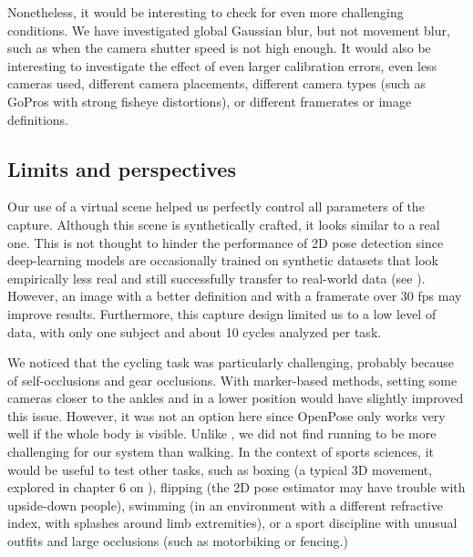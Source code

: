 Nonetheless, it would be interesting to check for even more challenging conditions. We have investigated global Gaussian blur, but not movement blur, such as when the camera shutter speed is not high enough. It would also be interesting to investigate the effect of even larger calibration errors, even less cameras used, different camera placements, different camera types (such as GoPros with strong fisheye distortions), or different framerates or image definitions.


\subsection{Limits and perspectives}

Our use of a virtual scene helped us perfectly control all parameters of the capture. Although this scene is synthetically crafted, it looks similar to a real one. This is not thought to hinder the performance of 2D pose detection since deep-learning models are occasionally trained on synthetic datasets that look empirically less real and still successfully transfer to real-world data (see \cite{Patel2021,Wood2021,Bolanos2021,Varol2017}). However, an image with a better definition and with a framerate over 30 fps may improve results. Furthermore, this capture design limited us to a low level of data, with only one subject and about 10 cycles analyzed per task.

We noticed that the cycling task was particularly challenging, probably because of self-occlusions and gear occlusions. With marker-based methods, setting some cameras closer to the ankles and in a lower position would have slightly improved this issue. However, it was not an option here since OpenPose only works very well if the whole body is visible. Unlike \cite{D'Antonio2021}, we did not find running to be more challenging for our system than walking. In the context of sports sciences, it would be useful to test other tasks, such as boxing (a typical 3D movement, explored in chapter 6 on  \cite{Pagnon2022c}), flipping (the 2D pose estimator may have trouble with upside-down people), swimming (in an environment with a different refractive index, with splashes around limb extremities), or a sport discipline with unusual outfits and large occlusions (such as motorbiking or fencing.)

